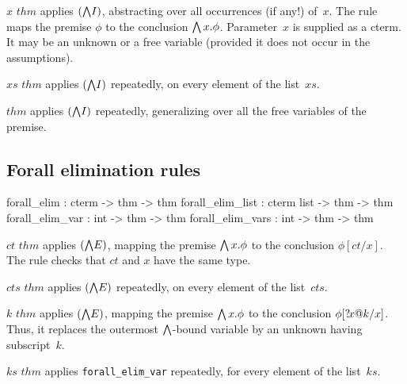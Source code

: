 \begin{ttdescription}
\item[\ttindexbold{forall_intr} $x$ $thm$] 
applies $({\bigwedge}I)$, abstracting over all occurrences (if any!) of~$x$.
The rule maps the premise $\phi$ to the conclusion $\bigwedge x.\phi$.
Parameter~$x$ is supplied as a cterm.  It may be an unknown or a free
variable (provided it does not occur in the assumptions).

\item[\ttindexbold{forall_intr_list} $xs$ $thm$] 
applies $({\bigwedge}I)$ repeatedly, on every element of the list~$xs$.

\item[\ttindexbold{forall_intr_frees} $thm$] 
applies $({\bigwedge}I)$ repeatedly, generalizing over all the free variables
of the premise.
\end{ttdescription}


\subsection{Forall elimination rules}
\begin{ttbox} 
forall_elim       : cterm      -> thm -> thm
forall_elim_list  : cterm list -> thm -> thm
forall_elim_var   :        int -> thm -> thm
forall_elim_vars  :        int -> thm -> thm
\end{ttbox}

\begin{ttdescription}
\item[\ttindexbold{forall_elim} $ct$ $thm$] 
applies $({\bigwedge}E)$, mapping the premise $\bigwedge x.\phi$ to the conclusion
$\phi[ct/x]$.  The rule checks that $ct$ and $x$ have the same type.

\item[\ttindexbold{forall_elim_list} $cts$ $thm$] 
applies $({\bigwedge}E)$ repeatedly, on every element of the list~$cts$.

\item[\ttindexbold{forall_elim_var} $k$ $thm$] 
applies $({\bigwedge}E)$, mapping the premise $\bigwedge x.\phi$ to the conclusion
$\phi[{?\!x@k}/x]$.  Thus, it replaces the outermost $\bigwedge$-bound
variable by an unknown having subscript~$k$.

\item[\ttindexbold{forall_elim_vars} $ks$ $thm$] 
applies {\tt forall_elim_var} repeatedly, for every element of the list~$ks$.
\end{ttdescription}

